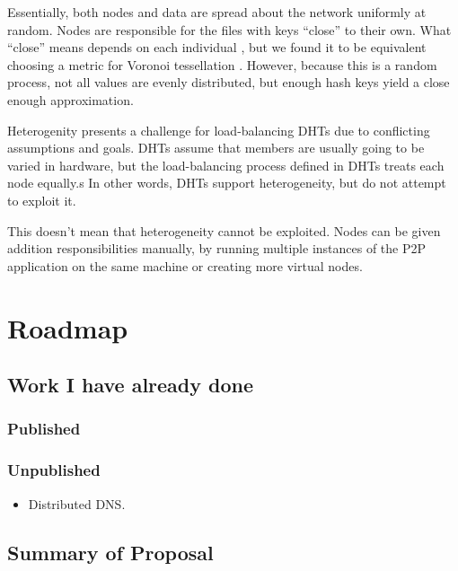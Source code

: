 Essentially, both nodes and data are spread about the network uniformly at random.
Nodes are responsible for the files with keys ``close'' to their own.
What ``close'' means depends on each individual , but we found it to be equivalent choosing a metric for Voronoi tessellation \cite{vhash}.
However, because this is a random process, not all values are evenly distributed, but enough hash keys yield a close enough approximation.

Heterogenity presents a challenge for load-balancing DHTs due to conflicting assumptions and goals. 
DHTs assume that members are usually going to be varied in hardware, but the load-balancing process defined in DHTs treats each node equally.s
In other words, DHTs support heterogeneity, but do not attempt to exploit it.

This doesn't mean that heterogeneity cannot be exploited.
Nodes can be given addition responsibilities manually, by running multiple instances of the P2P application on the same machine or creating more virtual nodes.



\section{Roadmap}

\subsection{Work I have already done}

\subsubsection{Published}

\subsubsection{Unpublished}
\begin{itemize}
	\item Distributed DNS.
\end{itemize}
\subsection{Summary of Proposal}



